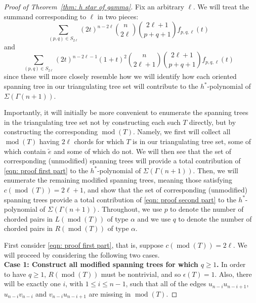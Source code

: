 \documentclass{amsart}
\numberwithin{equation}{section}
\theoremstyle{plain}
\theoremstyle{definition}
\DeclareMathOperator{\md}{mod}
\newcommand{\etilde}{\widetilde{e}}
\begin{document}
\begin{proof}[Proof of Theorem~\ref{thm: h star of gamma}]
    Fix an arbitrary $\ell$.
    We will treat the summand corresponding to $\ell$ in two pieces:
    \begin{equation}\label{eqn: proof first part}
        \sum_{(p,q) \in S_{2\ell}} (2t)^{n-2\ell}\binom{n}{2\ell}\binom{2\ell+1}{p+q+1}f_{p,q,\ell}(t)
    \end{equation}
    and
    \begin{equation}\label{eqn: proof second part}
        \sum_{(p,q) \in S_{2\ell}} (2t)^{n-2\ell-1}(1+t)^2\binom{n}{2\ell+1}\binom{2\ell+1}{p+q+1}f_{p,q,\ell}(t)
    \end{equation}
    since these will more closely resemble how we will identify how each oriented spanning tree in our triangulating tree set will contribute to the $h^*$-polynomial of $\Sigma(\Gamma(n+1))$.

    Importantly, it will initially be more convenient to enumerate the spanning trees in the triangulating tree set not by constructing each such $T$ directly, but by constructing the corresponding $\md(T)$.
    Namely, we first will collect all $\md(T)$ having $2\ell$ chords for which $T$ is in our triangulating tree set, some of which contain $\etilde$ and some of which do not.
    We will then see that the set of corresponding (unmodified) spanning trees will provide a total contribution of \eqref{eqn: proof first part} to the $h^*$-polynomial of $\Sigma(\Gamma(n+1))$.
    Then, we will enumerate the remaining modified spanning trees, meaning those satisfying $c(\md(T)) = 2\ell+1$, and show that the set of corresponding (unmodified) spanning trees provide a total contribution of \eqref{eqn: proof second part} to the $h^*$-polynomial of $\Sigma(\Gamma(n+1))$.
    Throughout, we use $p$ to denote the number of chorded pairs in %
    $L(\md(T))$ of type $\alpha$ and we use $q$ to denote the number of chorded pairs in %
    $R(\md(T))$ of type $\alpha$.

    First consider \eqref{eqn: proof first part}, that is, suppose $c(\md(T)) = 2\ell$.
    We will proceed by considering the following two cases. \\
    
    \noindent \textbf{Case 1: Construct all modified spanning trees for which $q \geq 1$.}
    In order to have $q \geq 1$, $R(\md(T))$ must be nontrivial, and so $\epsilon(T)=1$. 
    Also, there will be exactly one $i$, with $1 \leq i \leq n-1$, such that all of the edges $u_{n-i}u_{n-i+1}$, $u_{n-i}v_{n-i}$ and $v_{n-i}u_{n-i+1}$ are missing in $\md(T)$. 
    

\end{proof}
\end{document}
